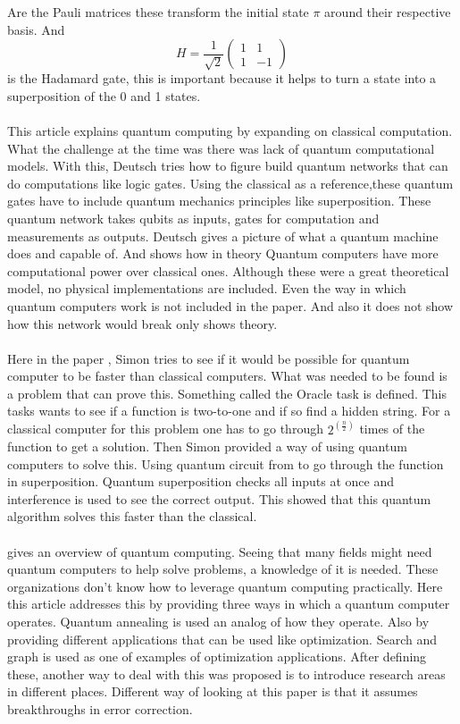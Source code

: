 \documentclass[15pt, a4paper]{Assignment}
\begin{document}
Are the Pauli matrices these transform the initial state $\pi$ around their respective basis.
And \begin{equation}H=\frac{1}{\sqrt{2}}
	\begin{pmatrix}
		1&1\\1&-1
	\end{pmatrix}
\end{equation} is the Hadamard gate, this is important because it helps to turn a state into a superposition of the 0 and 1 states.
\\
\\
This article \cite{Deutsch1989} explains quantum computing by expanding on classical computation.
What the challenge at the time was there was lack of quantum computational models.
With this, Deutsch tries how to figure build quantum networks that can do computations like logic gates.
Using the classical as a reference,these quantum gates have to include quantum mechanics principles like superposition.
These quantum network takes qubits as inputs, gates for computation and measurements as outputs.
Deutsch gives a picture of what a quantum machine does and capable of.
And shows how in theory Quantum computers have more computational power over classical ones.
Although these were a great theoretical model, no physical implementations are included.
Even the way in which quantum computers work is not included in the paper.
And also it does not show how this network would break only shows theory.
\\\\
Here in the paper \cite{doi:10.1137/S0097539796298637}, Simon tries to see if it would be possible for quantum computer to be faster than classical computers.
What was needed to be found is a problem that can prove this.
Something called the Oracle task is defined.
This tasks wants to see if a function is two-to-one and if so find a hidden string.
For a classical computer for this problem one has to go through $ 2^{\left(\frac{n}{2}\right)}$ times of the function to get a solution. 
Then Simon provided a way of using quantum computers to solve this.
Using quantum circuit from \cite{Deutsch1989} to go through the function in superposition.
Quantum superposition checks all inputs at once and interference is used to see the correct output.
This showed that this quantum algorithm solves this faster than the classical.
\\\\
\cite{rietsche2022quantum} gives an overview of quantum computing.
Seeing that many fields might need quantum computers to help solve problems, a knowledge of it is needed.
These organizations don’t know how to leverage quantum computing practically.
Here this article addresses this by providing three ways in which a quantum computer operates.
Quantum annealing is used an analog of how they operate.
Also by providing different applications that can be used like optimization.
Search and graph is used as one of examples of optimization applications.
After defining these, another way to deal with this was proposed is to introduce research areas in different places.
Different way of looking at this paper is that it assumes breakthroughs in error correction.
\newpage
\end{document}
